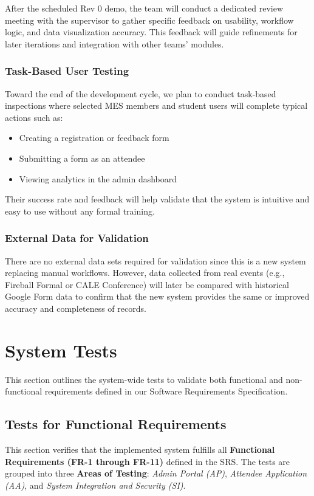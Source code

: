 \documentclass[12pt, titlepage]{article}
\begin{document}
After the scheduled Rev 0 demo, the team will conduct a dedicated review meeting with the supervisor to gather specific feedback on usability, workflow logic, and data visualization accuracy. This feedback will guide refinements for later iterations and integration with other teams’ modules.

\subsubsection*{Task-Based User Testing}
Toward the end of the development cycle, we plan to conduct task-based inspections where selected MES members and student users will complete typical actions such as:
\begin{itemize}
  \item Creating a registration or feedback form
  \item Submitting a form as an attendee
  \item Viewing analytics in the admin dashboard
\end{itemize}
Their success rate and feedback will help validate that the system is intuitive and easy to use without any formal training.

\subsubsection*{External Data for Validation}
There are no external data sets required for validation since this is a new system replacing manual workflows. However, data collected from real events (e.g., Fireball Formal or CALE Conference) will later be compared with historical Google Form data to confirm that the new system provides the same or improved accuracy and completeness of records.

\section{System Tests}

This section outlines the system-wide tests to validate both functional and non-functional requirements defined in our Software Requirements Specification.

\subsection{Tests for Functional Requirements}

This section verifies that the implemented system fulfills all \textbf{Functional Requirements (FR-1 through FR-11)} defined in the SRS.
The tests are grouped into three \textbf{Areas of Testing}: \textit{Admin Portal (AP)}, \textit{Attendee Application (AA)}, and \textit{System Integration and Security (SI)}.
\end{document}

